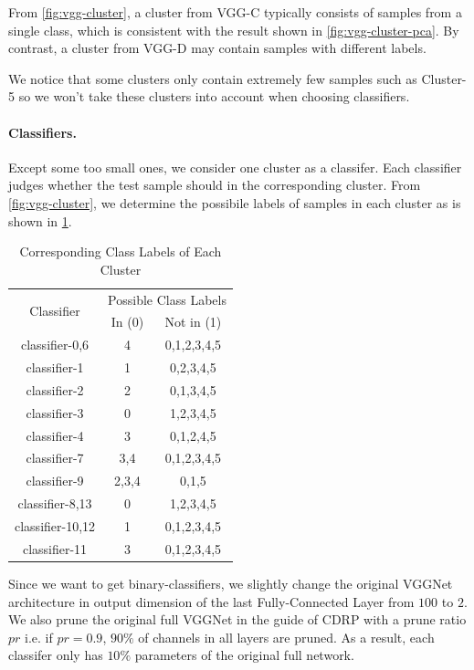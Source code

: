 \documentclass[sigplan,10pt,review]{acmart}\settopmatter{printfolios=true,printccs=false,printacmref=false}
\begin{document}
From \cref{fig:vgg-cluster}, a cluster from VGG-C typically consists of samples from a single class, which is consistent with the result shown in \cref{fig:vgg-cluster-pca}. 
By contrast, a cluster from VGG-D may contain samples with different labels.

We notice that some clusters only contain extremely few samples such as Cluster-5 so we won't take these clusters into account when choosing classifiers.

\paragraph{Classifiers.} Except some too small ones, we consider one cluster as a classifer. Each classifier judges whether the test sample should in the corresponding cluster. 
From \cref{fig:vgg-cluster}, we determine the possibile labels of samples in each cluster as is shown in \cref{tab:cluster_label}. 

\begin{table}[h]
	\caption{Corresponding Class Labels of Each Cluster}
	\label{tab:cluster_label}
	\begin{tabular}{|c|c|c|}
	\hline
	\multirow{2}{*}{Classifier} &\multicolumn{2}{|c|}{Possible Class Labels}\\
	\cline{2-3}
	& In (0) & Not in (1)\\
	\hline
	classifier-0,6 & 4 & 0,1,2,3,4,5\\
	classifier-1 & 1 & 0,2,3,4,5\\
	classifier-2 & 2 & 0,1,3,4,5\\
	classifier-3 & 0 & 1,2,3,4,5\\
	classifier-4 & 3 & 0,1,2,4,5\\
	classifier-7 & 3,4 & 0,1,2,3,4,5\\ 
	classifier-9 & 2,3,4 & 0,1,5\\ 
	classifier-8,13 & 0 & 1,2,3,4,5\\
	classifier-10,12 & 1 & 0,1,2,3,4,5\\
	classifier-11 & 3 & 0,1,2,3,4,5\\
	\hline
	\end{tabular}
\end{table}

Since we want to get binary-classifiers, we slightly change the original VGGNet architecture in output dimension of the last Fully-Connected Layer from $100$ to $2$. 
We also prune the original full VGGNet in the guide of CDRP with a prune ratio $pr$ i.e. if $pr=0.9$, $90\%$ of channels in all layers are pruned. 
As a result, each classifer only has $10\%$ parameters of the original full network.
\end{document}
